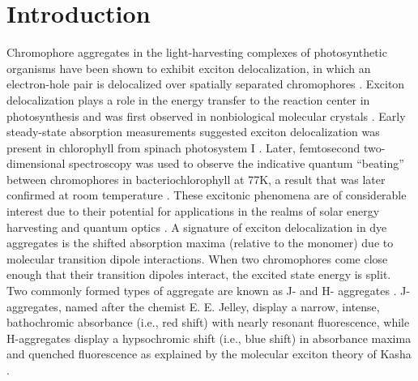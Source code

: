 \section{Introduction}
Chromophore aggregates in the light-harvesting complexes of photosynthetic organisms have been shown to exhibit exciton delocalization, in which an electron-hole pair is delocalized over spatially separated chromophores \cite{Engel2007, Collini2010a, Fassioli2014}. Exciton delocalization plays a role in the energy transfer to the reaction center in photosynthesis and was first observed in nonbiological molecular crystals \cite{Frenkel1931, Frenkel1931a, Davydov1964, Eisfeld2007, Eisfeld2006a}. Early steady-state absorption measurements suggested exciton delocalization was present in chlorophyll from spinach photosystem I \cite{Philipson1972}. Later, femtosecond two-dimensional spectroscopy was used to observe the indicative quantum “beating” between chromophores in bacteriochlorophyll at 77K, a result that was later confirmed at room temperature \cite{Marcus1965a, Lloyd2011a}.  These excitonic phenomena are of considerable interest due to their potential for applications in the realms of solar energy harvesting and quantum optics \cite{Smyth2012a, Rossi2004, Childs2013a}. A signature of exciton delocalization in dye aggregates is the shifted absorption maxima (relative to the monomer) due to molecular transition dipole interactions. When two chromophores come close enough that their transition dipoles interact, the excited state energy is split. Two commonly formed types of aggregate are known as J- and H- aggregates \cite{Wurthner2011}. J-aggregates, named after the chemist E. E. Jelley, display a narrow, intense, bathochromic absorbance (i.e., red shift) with nearly resonant fluorescence, while H-aggregates display a hypsochromic shift (i.e., blue shift) in absorbance maxima and quenched fluorescence as explained by the molecular exciton theory of Kasha \cite{Kasha1963}. 

